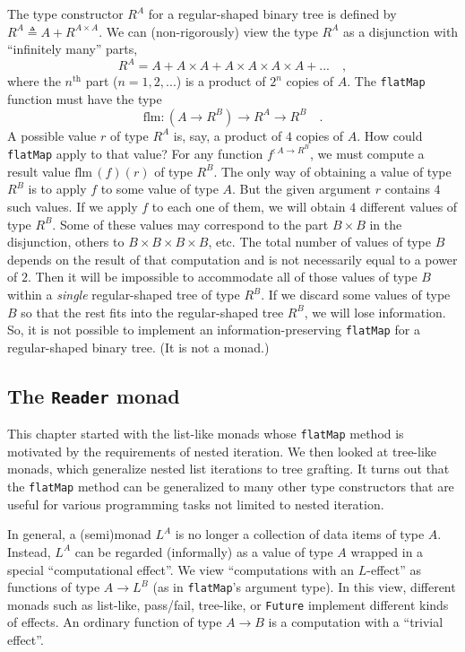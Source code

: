 The type constructor $R^{A}$ for a regular-shaped binary tree is
defined by $R^{A}\triangleq A+R^{A\times A}$. We can (non-rigorously)
view the type $R^{A}$ as a disjunction with \textsf{``}infinitely many\textsf{''}
parts,
\[
R^{A}=A+A\times A+A\times A\times A\times A+...\quad,
\]
where the $n^{\text{th}}$ part ($n=1,2,...$) is a product of $2^{n}$
copies of $A$. The \lstinline!flatMap! function must have the type
\[
\text{flm}:(A\rightarrow R^{B})\rightarrow R^{A}\rightarrow R^{B}\quad.
\]
A possible value $r$ of type $R^{A}$ is, say, a product of $4$
copies of $A$. How could \lstinline!flatMap! apply to that value?
For any function $f^{:A\rightarrow R^{B}}$, we must compute a result
value $\text{flm}\,(f)(r)$ of type $R^{B}$. The only way of obtaining
a value of type $R^{B}$ is to apply $f$ to some value of type $A$.
But the given argument $r$ contains $4$ such values. If we apply
$f$ to each one of them, we will obtain $4$ different values of
type $R^{B}$. Some of these values may correspond to the part $B\times B$
in the disjunction, others to $B\times B\times B\times B$, etc. The
total number of values of type $B$ depends on the result of that
computation and is not necessarily equal to a power of $2$. Then
it will be impossible to accommodate all of those values of type $B$
within a \emph{single} regular-shaped tree of type $R^{B}$. If we
discard some values of type $B$ so that the rest fits into the regular-shaped
tree $R^{B}$, we will lose information. So, it is not possible to
implement an information-preserving \lstinline!flatMap! for a regular-shaped
binary tree. (It is not a monad.)

\subsection{The \texttt{Reader} monad\label{subsec:The-Reader-monad}}

This chapter started
with the list-like monads whose \lstinline!flatMap! method is motivated
by the requirements of nested iteration. We then looked at tree-like
monads, which generalize nested list iterations to tree grafting.
It turns out that the \lstinline!flatMap! method can be generalized
to many other type constructors that are useful for various programming
tasks not limited to nested iteration.

In general, a (semi)monad $L^{A}$ is no longer a collection of data
items of type $A$. Instead, $L^{A}$ can be regarded (informally)
as a value of type $A$ wrapped in a special \textsf{``}computational effect\textsf{''}.
We view \textsf{``}computations with an $L$-effect\textsf{''} as functions of type
$A\rightarrow L^{B}$ (as in \lstinline!flatMap!\textsf{'}s argument type).
In this view, different monads \textemdash{} such as list-like, pass/fail,
tree-like, or \lstinline!Future! \textemdash{} implement different
kinds of effects. An ordinary function of type $A\rightarrow B$ is
a computation with a \textsf{``}trivial effect\textsf{''}.

